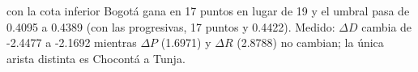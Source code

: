{con la cota inferior Bogotá gana en 17 puntos en lugar de 19 y el umbral pasa de 0.4095 a 0.4389 (con las progresivas, 17 puntos y 0.4422).}
{Medido: $\Delta D$ cambia de -2.4477 a -2.1692 mientras $\Delta P$ (1.6971) y $\Delta R$ (2.8788) no cambian; la única arista distinta es Chocontá a Tunja.}

